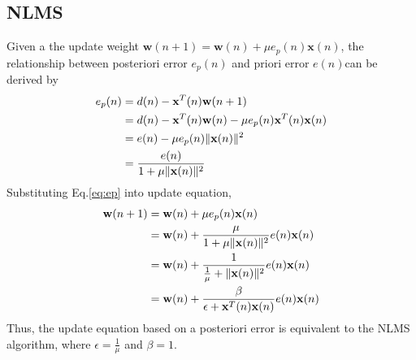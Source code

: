 \subsection{NLMS}
Given a the update weight $\mathbf{w}(n+1)=\mathbf{w}(n)+\mu e_p(n)\mathbf{x}(n)$, the relationship between posteriori error $e_p(n)$ and priori error $e(n)$can be derived by 
\begin{align}
e_p(n)&=d(n)-\mathbf{x}^T(n)\mathbf{w}(n+1)\notag\\
	  &=d(n)-\mathbf{x}^T(n)\mathbf{w}(n)-\mu e_p(n)\mathbf{x}^T(n)\mathbf{x}(n) \notag\\
	  &=e(n)-\mu e_p(n)\|\mathbf{x}(n)\|^2\notag\\
	  &=\frac{e(n)}{1+\mu \|\mathbf{x}(n)\|^2} \label{eq:ep}
\end{align}
Substituting Eq.\ref{eq:ep} into update equation,
\begin{align}
	\mathbf{w}(n+1)&=\mathbf{w}(n)+\mu e_p(n)\mathbf{x}(n)\notag\\
				   &=\mathbf{w}(n)+ \frac{\mu}{1+\mu \|\mathbf{x}(n)\|^2} e(n)\mathbf{x}(n)\notag\\
				   &=\mathbf{w}(n)+ \frac{1}{\frac{1}{\mu}+\|\mathbf{x}(n)\|^2} e(n)\mathbf{x}(n)\notag\\
				   &=\mathbf{w}(n)+ \frac{\beta}{\epsilon+\mathbf{x}^T(n)\mathbf{x}(n) } e(n)\mathbf{x}(n)\label{eq:nllms}
\end{align}
Thus, the update equation based on a posteriori error is equivalent to the NLMS algorithm, where $\epsilon=\frac{1}{\mu}$ and $\beta=1$.
